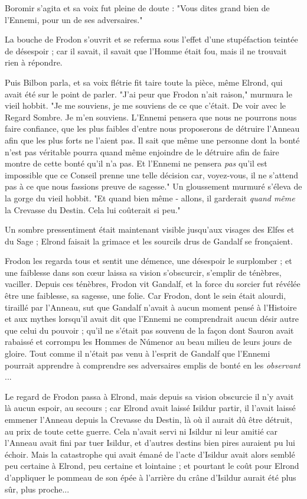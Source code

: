 Boromir s'agita et sa voix fut pleine de doute : "Vous dites grand bien de l'Ennemi, pour un de ses adversaires."

La bouche de Frodon s'ouvrit et se referma sous l'effet d'une stupéfaction teintée de désespoir ; car il savait, il savait que l'Homme était fou, mais il ne trouvait rien à répondre.

Puis Bilbon parla, et sa voix flétrie fit taire toute la pièce, même Elrond, qui avait été sur le point de parler. "J'ai peur que Frodon n'ait raison," murmura le vieil hobbit. "Je me souviens, je me souviens de ce que c'était. De voir avec le Regard Sombre. Je m'en souviens. L'Ennemi pensera que nous ne pourrons nous faire confiance, que les plus faibles d'entre nous proposerons de détruire l'Anneau afin que les plus forts ne l'aient pas. Il sait que même une personne dont la bonté n'est pas véritable pourra quand même enjoindre de le détruire afin de faire montre de cette bonté qu'il n'a pas. Et l'Ennemi ne pensera \emph{pas}  qu'il est impossible que ce Conseil prenne une telle décision car, voyez-vous, il ne s'attend pas à ce que nous fassions preuve de sagesse." Un gloussement murmuré s'éleva de la gorge du vieil hobbit. "Et quand bien même - allons, il garderait \emph{quand même}  la Crevasse du Destin. Cela lui coûterait si peu."

Un sombre pressentiment était maintenant visible jusqu'aux visages des Elfes et du Sage ; Elrond faisait la grimace et les sourcils drus de Gandalf se fronçaient.

Frodon les regarda tous et sentit une démence, une désespoir le surplomber ; et une faiblesse dans son cœur laissa sa vision s'obscurcir, s'emplir de ténèbres, vaciller. Depuis ces ténèbres, Frodon vit Gandalf, et la force du sorcier fut révélée être une faiblesse, sa sagesse, une folie. Car Frodon, dont le sein était alourdi, tiraillé par l'Anneau, sut que Gandalf n'avait à aucun moment pensé à l'Histoire et aux mythes lorsqu'il avait dit que l'Ennemi ne comprendrait aucun désir autre que celui du pouvoir ; qu'il ne s'était pas souvenu de la façon dont Sauron avait rabaissé et corrompu les Hommes de Númenor au beau milieu de leurs jours de gloire. Tout comme il n'était pas venu à l'esprit de Gandalf que l'Ennemi pourrait apprendre à comprendre ses adversaires emplis de bonté en les \emph{observant} ...

Le regard de Frodon passa à Elrond, mais depuis sa vision obscurcie il n'y avait là aucun espoir, au secours ; car Elrond avait laissé Isildur partir, il l'avait laissé emmener l'Anneau depuis la Crevasse du Destin, là où il aurait dû être détruit, au prix de toute cette guerre. Cela n'avait servi ni Isildur ni leur amitié car l'Anneau avait fini par tuer Isildur, et d'autres destins bien pires auraient pu lui échoir. Mais la catastrophe qui avait émané de l'acte d'Isildur avait alors semblé peu certaine à Elrond, peu certaine et lointaine ; et pourtant le coût pour Elrond d'appliquer le pommeau de son épée à l'arrière du crâne d'Isildur aurait été plus sûr, plus proche...


